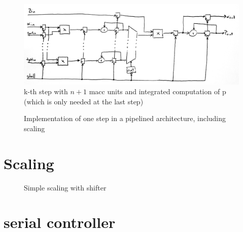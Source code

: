 \documentclass[mscthesis]{usiinfthesis}
\begin{document}
\begin{figure}
    \includegraphics[width=1\columnwidth]{./schema/arch_step_p.png}
    \caption{k-th step with $ n+1 $ macc units and integrated computation of p
        (which is only needed at the last step)}
    \label{fig:step_p}
\end{figure}

\begin{figure}
    \centering
    
    \caption{Implementation of one step in a pipelined architecture, including
        scaling}
    \label{fig:step_s}
\end{figure}

\section{Scaling}

\begin{figure}
    \centering
    
    \caption{Simple scaling with shifter}
    \label{fig:scale}
\end{figure}

\section{serial controller}
\end{document}
